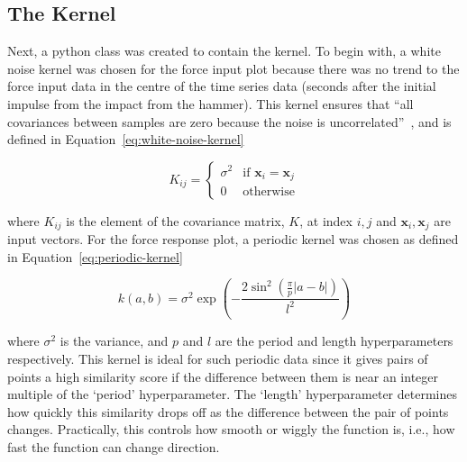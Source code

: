 \documentclass[12pt]{article}
\begin{document}
    \subsection{The Kernel}
    Next, a python class was created to contain the kernel.
    To begin with, a white noise kernel was chosen for the force input plot because there was no trend to the force input data in the centre of the time series data (seconds after the initial impulse from the impact from the hammer).
    This kernel ensures that ``all covariances between samples are zero because the noise is uncorrelated''~\cite{RoelantsGPKernels}, and is defined in Equation~\ref{eq:white-noise-kernel}

    \begin{equation}
        K_{ij} =
        \begin{cases}
            \sigma^2 & \text{if } \mathbf{x}_i = \mathbf{x}_j \\
            0 & \text{otherwise}
        \end{cases}\label{eq:white-noise-kernel}
    \end{equation}

    where $K_{ij}$ is the element of the covariance matrix, $K$, at index $i, j$ and $\mathbf{x}_i, \mathbf{x}_j$ are input vectors.
    For the force response plot, a periodic kernel was chosen as defined in Equation~\ref{eq:periodic-kernel}

    \begin{equation}
        k(a, b) = \sigma^2 \exp\left(- \frac{2 \sin^2\left(\frac{\pi}{p} |a - b|\right)}{l^2}\right)\label{eq:periodic-kernel}
    \end{equation}

    where $\sigma^2$ is the variance, and $p$ and $l$ are the period and length hyperparameters respectively.
    This kernel is ideal for such periodic data since it gives pairs of points a high similarity score if the difference between them is near an integer multiple of the `period' hyperparameter.
    The `length' hyperparameter determines how quickly this similarity drops off as the difference between the pair of points changes.
    Practically, this controls how smooth or wiggly the function is, i.e., how fast the function can change direction.
\end{document}
